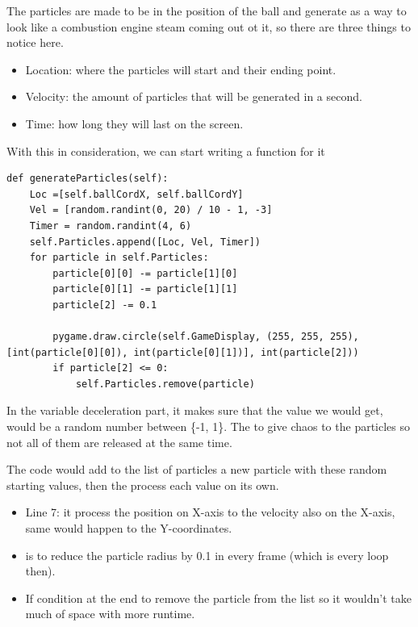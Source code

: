 The particles are made to be in the position of the ball and generate as a way to look like a combustion engine steam coming out ot it, so there are three things to notice here.
\begin{itemize}
\item Location: where the particles will start and their ending point.
\item Velocity: the amount of particles that will be generated in a second.
\item Time: how long they will last on the screen.
\end{itemize}

With this in consideration, we can start writing a function for it 

\begin{listing}[H]
	\begin{verbatim}
def generateParticles(self):
	Loc =[self.ballCordX, self.ballCordY] 
	Vel = [random.randint(0, 20) / 10 - 1, -3]
	Timer = random.randint(4, 6)
	self.Particles.append([Loc, Vel, Timer])
	for particle in self.Particles:
		particle[0][0] -= particle[1][0]
		particle[0][1] -= particle[1][1]
		particle[2] -= 0.1
		
		pygame.draw.circle(self.GameDisplay, (255, 255, 255), [int(particle[0][0]), int(particle[0][1])], int(particle[2]))
		if particle[2] <= 0:
			self.Particles.remove(particle)
	\end{verbatim}
\end{listing}

In the  variable deceleration part, it makes sure that the value we would get, would be a random number between \{-1, 1\}. The  to give chaos to the particles so not all of them are released at the same time.

The code would add to the list of particles a new particle with these random starting values, then the  process each value on its own.

\begin{itemize}
\item Line 7: it process the position on X-axis to the velocity also on the X-axis, same would happen to the Y-coordinates.
\item {} is to reduce the particle radius by 0.1 in every frame (which is every loop then).
\item If condition at the end to remove the particle from the list so it wouldn't take much of space with more runtime.
\end{itemize}

